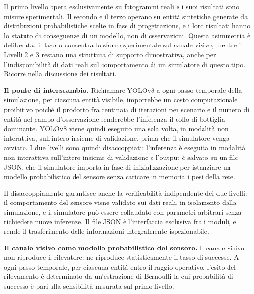 \documentclass[a4paper,12pt]{report}
\begin{document}
Il primo livello opera esclusivamente su fotogrammi reali e i suoi risultati
sono misure sperimentali. Il secondo e il terzo operano su entità
sintetiche generate da distribuzioni probabilistiche scelte in fase di progettazione, e i loro
risultati hanno lo statuto di conseguenze di un modello, non di osservazioni.
Questa asimmetria è deliberata: il lavoro concentra lo sforzo sperimentale sul
canale visivo, mentre i Livelli 2 e 3 restano una struttura di supporto
dimostrativa, anche per l'indisponibilità di dati reali sul comportamento di un
simulatore di questo tipo. Ricorre nella discussione dei risultati.

\textbf{Il ponte di interscambio.}
Richiamare YOLOv8 a ogni passo temporale della simulazione, per ciascuna
entità visibile, imporrebbe un costo computazionale proibitivo poichè il prodotto
fra centinaia di iterazioni per scenario e il numero di entità nel campo
d'osservazione renderebbe l'inferenza il collo di bottiglia dominante. YOLOv8
viene quindi eseguito una sola volta, in modalità non interattiva, sull'intero
insieme di validazione, prima che il simulatore venga avviato. I
due livelli sono quindi disaccoppiati: l'inferenza è eseguita in modalità non
interattiva sull'intero insieme di validazione e l'output è salvato su un file
JSON, che il simulatore importa in fase di inizializzazione per istanziare un
modello probabilistico del sensore senza caricare in memoria i pesi della rete.

Il disaccoppiamento garantisce anche la verificabilità indipendente dei due
livelli: il comportamento del sensore viene validato sui dati reali, in
isolamento dalla simulazione, e il simulatore può essere collaudato con
parametri arbitrari senza richiedere nuove inferenze. Il file JSON è l'interfaccia
esclusiva fra i moduli, e rende il trasferimento delle informazioni
integralmente ispezionabile.

\textbf{Il canale visivo come modello probabilistico del sensore.}
\label{sec:canale_visivo}
Il canale visivo non riproduce il rilevatore: ne riproduce statisticamente il
tasso di successo. A ogni passo temporale, per ciascuna entità entro il raggio
operativo, l'esito del rilevamento è determinato da un'estrazione di Bernoulli
la cui probabilità di successo è pari alla sensibilità misurata sul primo
livello.
\end{document}
